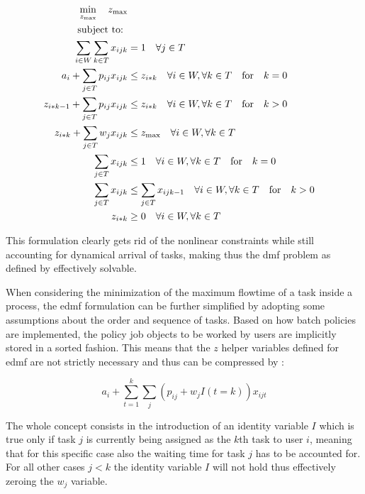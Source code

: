 \documentclass[draft=false]{seal_thesis}
\begin{document}
\begin{align}
    \min_{z_{\text{max}}} \quad z_{\text{max}}\\
    \text{subject to: } \notag \\
    \sum_{i \in W} \sum_{k \in T} x_{ijk} &= 1 \quad \forall j \in T\\
    a_i + \sum_{j \in T} p_{ij} x_{ijk} &\leq z_{i*k} \quad \forall i \in W, \forall k \in T \quad \text{for} \quad k=0\\
    z_{i*k-1} + \sum_{j \in T} p_{ij} x_{ijk} &\leq z_{i*k} \quad \forall i \in W, \forall k \in T \quad \text{for} \quad k>0\\
    z_{i*k}+ \sum_{j \in T} w_j x_{ijk} &\leq z_{\text{max}} \quad \forall i \in W, \forall k \in T\\
    \sum_{j \in T} x_{ijk} &\leq 1 \quad \forall i \in W, \forall k \in T \quad \text{for} \quad k=0\\
    \sum_{j \in T} x_{ijk} &\leq \sum_{j \in T} x_{ijk-1} \quad \forall i \in W, \forall k \in T \quad \text{for} \quad k>0\\
    z_{i*k} &\geq 0 \quad \forall i \in W, \forall k \in T
\end{align}

This formulation clearly gets rid of the nonlinear constraints while still accounting for dynamical arrival of tasks, making thus the \gls{dmf} problem as defined by \citet{Zeng2005} effectively solvable.

When considering the minimization of the maximum flowtime of a task inside a process, the \gls{edmf} formulation can be further simplified by adopting some assumptions about the order and sequence of tasks. Based on how batch policies are implemented, the policy job objects to be worked by users are implicitly stored in a sorted fashion. This means that the $z$ helper variables defined for \gls{edmf} are not strictly necessary and thus can be compressed by :

\begin{equation}
\label{eq:simplified_z_with_k}
	a_i + \sum_{t=1}^k \sum_j (p_{ij} + w_j I(t=k))x_{ijt}
\end{equation}

The whole concept consists in the introduction of an identity variable $I$ which is true only if task $j$ is currently being assigned as the $k$th task to user $i$, meaning that for this specific case also the waiting time for task $j$ has to be accounted for. For all other cases \ie $j<k$ the identity variable $I$ will not hold thus effectively zeroing the $w_j$ variable.
\end{document}
